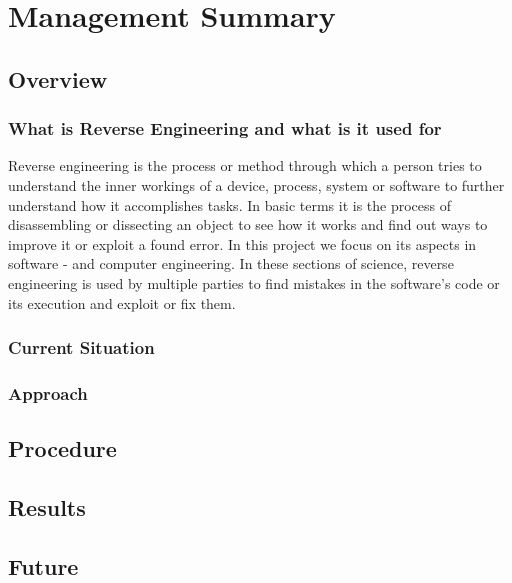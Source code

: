 \chapter{Management Summary}
\section{Overview}
\subsection{What is Reverse Engineering and what is it used for}
Reverse engineering is the process or method through which a person tries to understand the inner workings of a device, process, system or software to further understand how it accomplishes tasks. In basic terms it is the process of disassembling or dissecting an object to see how it works and find out ways to improve it or exploit a found error. In this project we focus on its aspects in software - and computer engineering. In these sections of science, reverse engineering is used by multiple parties to find mistakes in the software's code or its execution and exploit or fix them. 

\subsection{Current Situation}

\subsection{Approach}
\section{Procedure}

\section{Results}

\section{Future}